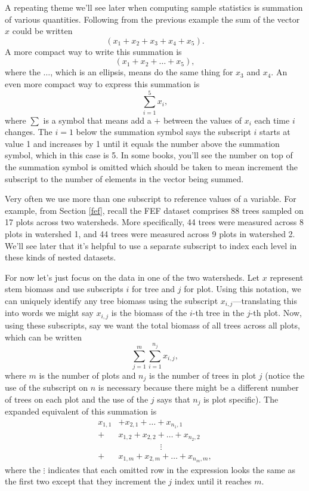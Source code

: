 \documentclass[
  11pt,
]{krantz}
\theoremstyle{definition}
\theoremstyle{definition}
\theoremstyle{definition}
\theoremstyle{definition}
\theoremstyle{remark}
\begin{document}
A repeating theme we'll see later when computing sample statistics is summation of various quantities. Following from the previous example the sum of the vector \(x\) could be written
\begin{equation*}
(x_1 + x_2 + x_3 + x_4 + x_5).
\end{equation*}
A more compact way to write this summation is
\begin{equation*}
(x_1 + x_2 + \ldots + x_5),
\end{equation*}
where the \(\ldots\), which is an ellipsis, means do the same thing for \(x_3\) and \(x_4\). An even more compact way to express this summation is
\begin{equation*}
\sum^5_{i=1}x_i,
\end{equation*}
where \(\sum\) is a symbol that means add a \(+\) between the values of \(x_i\) each time \(i\) changes. The \(i=1\) below the summation symbol says the subscript \(i\) starts at value 1 and increases by 1 until it equals the number above the summation symbol, which in this case is 5. In some books, you'll see the number on top of the summation symbol is omitted which should be taken to mean increment the subscript to the number of elements in the vector being summed.

Very often we use more than one subscript to reference values of a variable. For example, from Section \ref{fef}, recall the FEF dataset comprises 88 trees sampled on 17 plots across two watersheds. More specifically, 44 trees were measured across 8 plots in watershed 1, and 44 trees were measured across 9 plots in watershed 2. We'll see later that it's helpful to use a separate subscript to index each level in these kinds of nested datasets.

For now let's just focus on the data in one of the two watersheds. Let \(x\) represent stem biomass and use subscripts \(i\) for tree and \(j\) for plot. Using this notation, we can uniquely identify any tree biomass using the subscript \(x_{i,j}\)---translating this into words we might say \(x_{i,j}\) is the biomass of the \(i\)-th tree in the \(j\)-th plot. Now, using these subscripts, say we want the total biomass of all trees across all plots, which can be written
\begin{equation*}
\sum^{m}_{j=1}\sum^{n_j}_{i=1}x_{i,j},
\label{eq:ijSum}
\end{equation*}
where \(m\) is the number of plots and \(n_j\) is the number of trees in plot \(j\) (notice the use of the subscript on \(n\) is necessary because there might be a different number of trees on each plot and the use of the \(j\) says that \(n_j\) is plot specific). The expanded equivalent of this summation is
\begin{align*}
x_{1,1}&+x_{2,1}+\ldots +x_{n_1,1}\nonumber\\
+&x_{1,2}+x_{2,2}+\ldots +x_{n_2,2}\nonumber\\
&\quad\quad\quad\quad\quad\vdots\nonumber\\
+&x_{1,m}+x_{2,m}+\ldots +x_{n_m,m},
\label{eq:ijSumE}
\end{align*}
where the \(\vdots\) indicates that each omitted row in the expression looks the same as the first two except that they increment the \(j\) index until it reaches \(m\).
\end{document}
